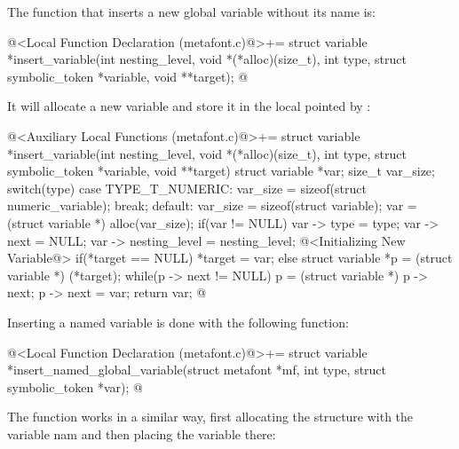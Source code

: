 The function that inserts a new global variable without its name is:

\iniciocodigo
@<Local Function Declaration (metafont.c)@>+=
struct variable *insert_variable(int nesting_level,
                                 void *(*alloc)(size_t),
                                 int type,
                                 struct symbolic_token *variable,
                                 void **target);
@
\fimcodigo

It will allocate a new variable and store it in the local pointed
by :

\iniciocodigo
@<Auxiliary Local Functions (metafont.c)@>+=
struct variable *insert_variable(int nesting_level,
                                 void *(*alloc)(size_t),
                                 int type,
                                 struct symbolic_token *variable,
                                 void **target){
  struct variable *var;
  size_t var_size;
  switch(type){
    case TYPE_T_NUMERIC:
      var_size = sizeof(struct numeric_variable);
      break;
    default:
      var_size = sizeof(struct variable);
  }
  var = (struct variable *) alloc(var_size);
  if(var != NULL){
    var -> type = type;
    var -> next = NULL;
    var -> nesting_level = nesting_level;
    @<Initializing New Variable@>
  }
  if(*target == NULL)
    *target = var;
  else{
    struct variable *p = (struct variable *) (*target);
    while(p -> next != NULL)
      p = (struct variable *) p -> next;
    p -> next = var;
  }
  return var;
}
@
\fimcodigo

Inserting a named variable is done with the following function:

\iniciocodigo
@<Local Function Declaration (metafont.c)@>+=
struct variable *insert_named_global_variable(struct metafont *mf,
                                             int type,
                                             struct symbolic_token *var);
@
\fimcodigo

The function works in a similar way, first allocating the structure
with the variable nam and then placing the variable there:


